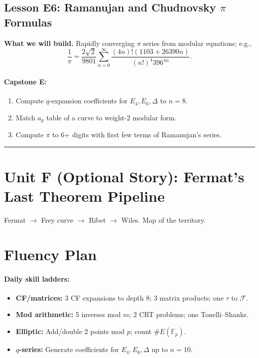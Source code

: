\documentclass[11pt]{article}
\begin{document}
\subsection*{Lesson E6: Ramanujan and Chudnovsky $\pi$ Formulas}
\textbf{What we will build.} Rapidly converging $\pi$ series from modular equations; e.g.,
\[
\frac{1}{\pi}=\frac{2\sqrt{2}}{9801}\sum_{n=0}^\infty\frac{(4n)!(1103+26390n)}{(n!)^4 396^{4n}}.
\]

\paragraph{Capstone E:}
\begin{enumerate}
\item Compute $q$-expansion coefficients for $E_4,E_6,\Delta$ to $n=8$.
\item Match $a_p$ table of a curve to weight-2 modular form.
\item Compute $\pi$ to 6+ digits with first few terms of Ramanujan’s series.
\end{enumerate}

\bigskip
\hrule
\bigskip

\section*{Unit F (Optional Story): Fermat's Last Theorem Pipeline}
Fermat $\to$ Frey curve $\to$ Ribet $\to$ Wiles. Map of the territory.

\section*{Fluency Plan}
\paragraph{Daily skill ladders:}
\begin{itemize}
\item \textbf{CF/matrices:} 3 CF expansions to depth 8; 3 matrix products; one $\tau$ to $\mathcal{F}$.
\item \textbf{Mod arithmetic:} 5 inverses mod $m$; 2 CRT problems; one Tonelli--Shanks.
\item \textbf{Elliptic:} Add/double 2 points mod $p$; count $\#E(\mathbb{F}_p)$.
\item \textbf{$q$-series:} Generate coefficients for $E_4,E_6,\Delta$ up to $n=10$.
\end{itemize}
\end{document}
